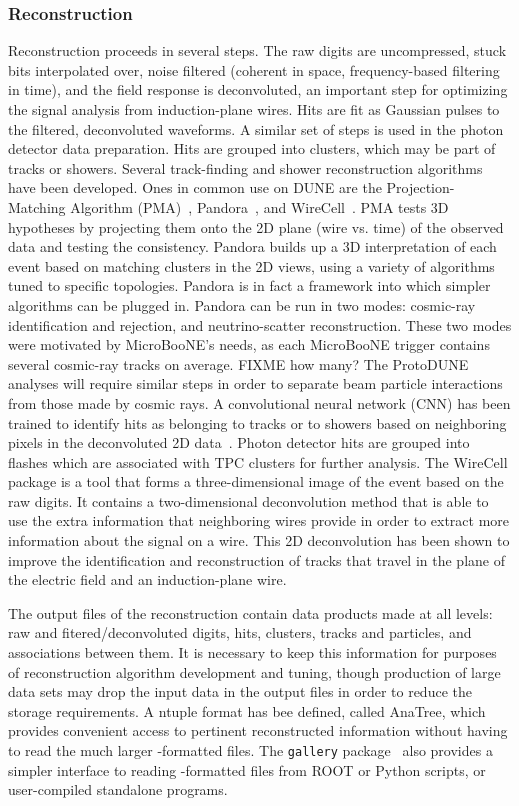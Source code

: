 \subsubsection{Reconstruction}

Reconstruction proceeds in several steps.  The raw digits are uncompressed, stuck bits interpolated over,
noise filtered (coherent in space, frequency-based filtering in time), and the field response is deconvoluted,
an important step for optimizing the signal analysis from induction-plane wires.  Hits are fit as Gaussian
pulses to the filtered, deconvoluted waveforms.  A similar set of steps is used in the photon detector data
preparation.  Hits are grouped into clusters, which may be part of tracks or showers.  Several track-finding
and shower reconstruction algorithms have been developed.  Ones in common use on DUNE are the Projection-Matching
Algorithm (PMA)~\cite{PMA}, Pandora~\cite{Pandora}, and WireCell~\cite{wirecell}.  
PMA tests 3D hypotheses by projecting them onto the  2D plane (wire vs. time) of the observed data and 
testing the consistency.  Pandora builds up a 3D interpretation
of each event based on matching clusters in the 2D views, using a variety of algorithms tuned to specific topologies.
Pandora is in fact a framework into which simpler algorithms can be plugged in.  Pandora can be run in two modes:
cosmic-ray identification and rejection, and neutrino-scatter reconstruction.  These two modes were motivated by
MicroBooNE's needs, as each MicroBooNE trigger contains several cosmic-ray tracks on average.  FIXME how many?
The ProtoDUNE analyses will require similar steps in order to separate beam particle interactions from those
made by cosmic rays.  A convolutional neural network (CNN)
has been trained to identify hits as belonging to tracks or to showers based on neighboring pixels in the 
deconvoluted 2D data~\cite{CNN}.  Photon detector hits are grouped into flashes which are associated with
TPC clusters for further analysis.  The WireCell package is a tool that forms a three-dimensional image of the
event based on the raw digits.  It contains a two-dimensional deconvolution method that is able to use
the extra information that neighboring wires provide in order to extract more information about the signal on
a wire.  This 2D deconvolution has been shown to improve the identification and reconstruction of tracks that
travel in the plane of the electric field and an induction-plane wire.


The output files of the reconstruction contain data products made at all levels: raw and fitered/deconvoluted
digits, hits, clusters, tracks and particles, and associations between them.  It is necessary to keep this information
for purposes of reconstruction algorithm development and tuning, though production of large data sets may
drop the input data in the output files in order to reduce the storage requirements.  A ntuple format has bee
defined, called AnaTree, which provides convenient access to pertinent reconstructed information without
having to read the much larger {\art}-formatted files.  The {\tt gallery} package~\cite{gallery} also provides
a simpler interface to reading {\art}-formatted files from ROOT or Python scripts, or user-compiled standalone
programs.

